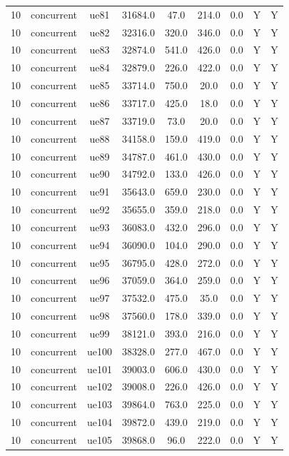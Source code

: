 \begin{table}[ht]
\begin{tabular}{|c|c|c|c|c|c|c|c|c|}
10 & concurrent & ue81 & 31684.0 & 47.0 & 214.0 & 0.0 & Y & Y \\
10 & concurrent & ue82 & 32316.0 & 320.0 & 346.0 & 0.0 & Y & Y \\
10 & concurrent & ue83 & 32874.0 & 541.0 & 426.0 & 0.0 & Y & Y \\
10 & concurrent & ue84 & 32879.0 & 226.0 & 422.0 & 0.0 & Y & Y \\
10 & concurrent & ue85 & 33714.0 & 750.0 & 20.0 & 0.0 & Y & Y \\
10 & concurrent & ue86 & 33717.0 & 425.0 & 18.0 & 0.0 & Y & Y \\
10 & concurrent & ue87 & 33719.0 & 73.0 & 20.0 & 0.0 & Y & Y \\
10 & concurrent & ue88 & 34158.0 & 159.0 & 419.0 & 0.0 & Y & Y \\
10 & concurrent & ue89 & 34787.0 & 461.0 & 430.0 & 0.0 & Y & Y \\
10 & concurrent & ue90 & 34792.0 & 133.0 & 426.0 & 0.0 & Y & Y \\
10 & concurrent & ue91 & 35643.0 & 659.0 & 230.0 & 0.0 & Y & Y \\
10 & concurrent & ue92 & 35655.0 & 359.0 & 218.0 & 0.0 & Y & Y \\
10 & concurrent & ue93 & 36083.0 & 432.0 & 296.0 & 0.0 & Y & Y \\
10 & concurrent & ue94 & 36090.0 & 104.0 & 290.0 & 0.0 & Y & Y \\
10 & concurrent & ue95 & 36795.0 & 428.0 & 272.0 & 0.0 & Y & Y \\
10 & concurrent & ue96 & 37059.0 & 364.0 & 259.0 & 0.0 & Y & Y \\
10 & concurrent & ue97 & 37532.0 & 475.0 & 35.0 & 0.0 & Y & Y \\
10 & concurrent & ue98 & 37560.0 & 178.0 & 339.0 & 0.0 & Y & Y \\
10 & concurrent & ue99 & 38121.0 & 393.0 & 216.0 & 0.0 & Y & Y \\
10 & concurrent & ue100 & 38328.0 & 277.0 & 467.0 & 0.0 & Y & Y \\
10 & concurrent & ue101 & 39003.0 & 606.0 & 430.0 & 0.0 & Y & Y \\
10 & concurrent & ue102 & 39008.0 & 226.0 & 426.0 & 0.0 & Y & Y \\
10 & concurrent & ue103 & 39864.0 & 763.0 & 225.0 & 0.0 & Y & Y \\
10 & concurrent & ue104 & 39872.0 & 439.0 & 219.0 & 0.0 & Y & Y \\
10 & concurrent & ue105 & 39868.0 & 96.0 & 222.0 & 0.0 & Y & Y \\

\end{tabular}
\end{table}
